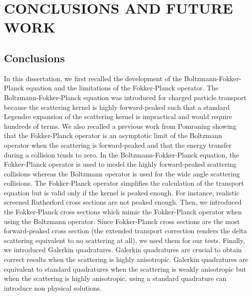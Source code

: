\chapter{\uppercase{Conclusions and future work}}\label{conclusion_chapter}
\section{Conclusions}
In this dissertation, we first recalled the development of the
Boltzmann-Fokker-Planck equation and the limitations of the Fokker-Planck operator.
The Boltzmann-Fokker-Planck equation was introduced for charged particle transport
because the scattering kernel is highly forward-peaked such that a standard Legendre
expansion of the scattering kernel is impractical and would require hundreds 
of terms. We also recalled a previous work from Pomraning showing that the 
Fokker-Planck operator is an asymptotic limit of the Boltzmann 
operator when the scattering is forward-peaked and that the energy transfer 
during a collision tends to zero. In the Boltzmann-Fokker-Planck equation, the 
Fokker-Planck operator is used to model the highly forward-peaked scattering
collisions whereas the Boltzmann operator is used for the wide angle
scattering collisions. The Fokker-Planck operator simplifies the calculation
of the transport equation but is valid only if the kernel is peaked enough.
For instance, realistic screened Rutherford cross sections are not peaked
enough. Then, we introduced the Fokker-Planck cross sections which mimic the
Fokker-Planck operator when using the Boltzmann operator. Since Fokker-Planck
cross sections are the most forward-peaked cross section (the extended
transport correction renders the delta scattering equivalent to no scattering
at all), we used them for our tests. Finally, we introduced Galerkin
quadratures. Galerkin quadratures are crucial to obtain correct results when
the scattering is highly anisotropic. Galerkin quadratures are equivalent to
standard quadratures when the scattering is weakly anisotropic but when the
scattering is highly anisotropic, using a standard quadrature can introduce
non physical solutions.

